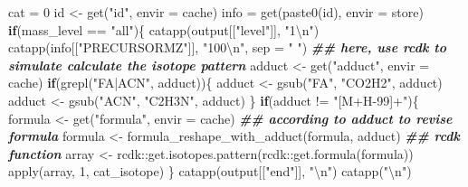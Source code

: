 \documentclass[
]{article}
\newenvironment{Shaded}{\begin{snugshade}}{\end{snugshade}}
\newcommand{\AttributeTok}[1]{\textcolor[rgb]{0.77,0.63,0.00}{#1}}
\newcommand{\ControlFlowTok}[1]{\textcolor[rgb]{0.13,0.29,0.53}{\textbf{#1}}}
\newcommand{\DecValTok}[1]{\textcolor[rgb]{0.00,0.00,0.81}{#1}}
\newcommand{\DocumentationTok}[1]{\textcolor[rgb]{0.56,0.35,0.01}{\textbf{\textit{#1}}}}
\newcommand{\FunctionTok}[1]{\textcolor[rgb]{0.00,0.00,0.00}{#1}}
\newcommand{\NormalTok}[1]{#1}
\newcommand{\OtherTok}[1]{\textcolor[rgb]{0.56,0.35,0.01}{#1}}
\newcommand{\SpecialCharTok}[1]{\textcolor[rgb]{0.00,0.00,0.00}{#1}}
\newcommand{\StringTok}[1]{\textcolor[rgb]{0.31,0.60,0.02}{#1}}
\begin{document}
\begin{Shaded}
\begin{Highlighting}[]
\NormalTok{      cat }\OtherTok{=} \DecValTok{0}
\NormalTok{      id }\OtherTok{\textless{}{-}} \FunctionTok{get}\NormalTok{(}\StringTok{"id"}\NormalTok{, }\AttributeTok{envir =}\NormalTok{ cache)}
\NormalTok{      info }\OtherTok{=} \FunctionTok{get}\NormalTok{(}\FunctionTok{paste0}\NormalTok{(id), }\AttributeTok{envir =}\NormalTok{ store)}
      \ControlFlowTok{if}\NormalTok{(mass\_level }\SpecialCharTok{==} \StringTok{"all"}\NormalTok{)\{}
        \FunctionTok{catapp}\NormalTok{(output[[}\StringTok{"level"}\NormalTok{]], }\StringTok{"1}\SpecialCharTok{\textbackslash{}n}\StringTok{"}\NormalTok{)}
        \FunctionTok{catapp}\NormalTok{(info[[}\StringTok{"PRECURSORMZ"}\NormalTok{]], }\StringTok{"100}\SpecialCharTok{\textbackslash{}n}\StringTok{"}\NormalTok{, }\AttributeTok{sep =} \StringTok{" "}\NormalTok{)}
        \DocumentationTok{\#\# here, use rcdk to simulate calculate the isotope pattern}
\NormalTok{        adduct }\OtherTok{\textless{}{-}} \FunctionTok{get}\NormalTok{(}\StringTok{"adduct"}\NormalTok{, }\AttributeTok{envir =}\NormalTok{ cache)}
        \ControlFlowTok{if}\NormalTok{(}\FunctionTok{grepl}\NormalTok{(}\StringTok{"FA|ACN"}\NormalTok{, adduct))\{}
\NormalTok{          adduct }\OtherTok{\textless{}{-}} \FunctionTok{gsub}\NormalTok{(}\StringTok{"FA"}\NormalTok{, }\StringTok{"CO2H2"}\NormalTok{, adduct)}
\NormalTok{          adduct }\OtherTok{\textless{}{-}} \FunctionTok{gsub}\NormalTok{(}\StringTok{"ACN"}\NormalTok{, }\StringTok{"C2H3N"}\NormalTok{, adduct)}
\NormalTok{        \}}
        \ControlFlowTok{if}\NormalTok{(adduct }\SpecialCharTok{!=} \StringTok{"[M+H{-}99]+"}\NormalTok{)\{}
\NormalTok{          formula }\OtherTok{\textless{}{-}} \FunctionTok{get}\NormalTok{(}\StringTok{"formula"}\NormalTok{, }\AttributeTok{envir =}\NormalTok{ cache)}
          \DocumentationTok{\#\# according to adduct to revise formula}
\NormalTok{          formula }\OtherTok{\textless{}{-}} \FunctionTok{formula\_reshape\_with\_adduct}\NormalTok{(formula, adduct)}
          \DocumentationTok{\#\# rcdk function}
\NormalTok{          array }\OtherTok{\textless{}{-}}\NormalTok{ rcdk}\SpecialCharTok{::}\FunctionTok{get.isotopes.pattern}\NormalTok{(rcdk}\SpecialCharTok{::}\FunctionTok{get.formula}\NormalTok{(formula))}
          \FunctionTok{apply}\NormalTok{(array, }\DecValTok{1}\NormalTok{, cat\_isotope)}
\NormalTok{        \}}
        \FunctionTok{catapp}\NormalTok{(output[[}\StringTok{"end"}\NormalTok{]], }\StringTok{"}\SpecialCharTok{\textbackslash{}n}\StringTok{"}\NormalTok{)}
        \FunctionTok{catapp}\NormalTok{(}\StringTok{"}\SpecialCharTok{\textbackslash{}n}\StringTok{"}\NormalTok{)}

\end{Highlighting}
\end{Shaded}
\end{document}
